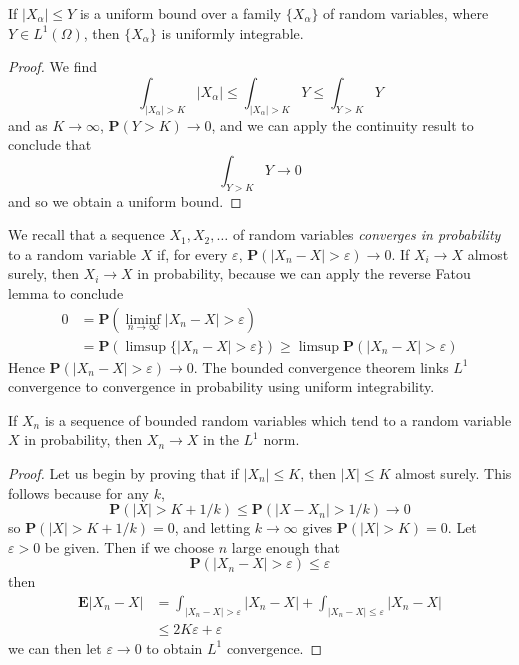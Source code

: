 \begin{corollary}
    If $|X_\alpha| \leq Y$ is a uniform bound over a family $\{ X_\alpha \}$ of random variables, where $Y \in L^1(\Omega)$, then $\{ X_\alpha \}$ is uniformly integrable.
\end{corollary}
\begin{proof}
    We find
    \[ \int_{|X_\alpha| > K} |X_\alpha| \leq \int_{|X_\alpha| > K} Y \leq \int_{Y > K} Y \]
    and as $K \to \infty$, $\mathbf{P}(Y > K) \to 0$, and we can apply the continuity result to conclude that
    \[ \int_{Y > K} Y \to 0 \]
    and so we obtain a uniform bound.
\end{proof}

We recall that a sequence $X_1, X_2, \dots$ of random variables \emph{converges in probability} to a random variable $X$ if, for every $\varepsilon$, $\mathbf{P}(|X_n - X| > \varepsilon) \to 0$. If $X_i \to X$ almost surely, then $X_i \to X$ in probability, because we can apply the reverse Fatou lemma to conclude
%
\begin{align*}
    0 &= \mathbf{P} \left( \liminf_{n \to \infty} |X_n - X| > \varepsilon \right)\\
    &= \mathbf{P} \left( \limsup \{ |X_n - X| > \varepsilon \} \right) \geq \limsup \mathbf{P}(|X_n - X| > \varepsilon)
\end{align*}
%
Hence $\mathbf{P}(|X_n - X| > \varepsilon) \to 0$. The bounded convergence theorem links $L^1$ convergence to convergence in probability using uniform integrability.

\begin{theorem}
    If $X_n$ is a sequence of bounded random variables which tend to a random variable $X$ in probability, then $X_n \to X$ in the $L^1$ norm.
\end{theorem}
\begin{proof}
    Let us begin by proving that if $|X_n| \leq K$, then $|X| \leq K$ almost surely. This follows because for any $k$,
    \[ \mathbf{P}(|X| > K + 1/k) \leq \mathbf{P}(|X - X_n| > 1/k) \to 0 \]
    so $\mathbf{P}(|X| > K + 1/k) = 0$, and letting $k \to \infty$ gives $\mathbf{P}(|X| > K) = 0$. Let $\varepsilon > 0$ be given. Then if we choose $n$ large enough that
    \[ \mathbf{P}(|X_n - X| > \varepsilon) \leq \varepsilon \]
    then
    \begin{align*}
        \mathbf{E}|X_n - X| &= \int_{|X_n - X| > \varepsilon} |X_n - X| + \int_{|X_n - X| \leq \varepsilon} |X_n - X|\\
        &\leq 2K\varepsilon + \varepsilon
    \end{align*}
    we can then let $\varepsilon \to 0$ to obtain $L^1$ convergence.
\end{proof}

